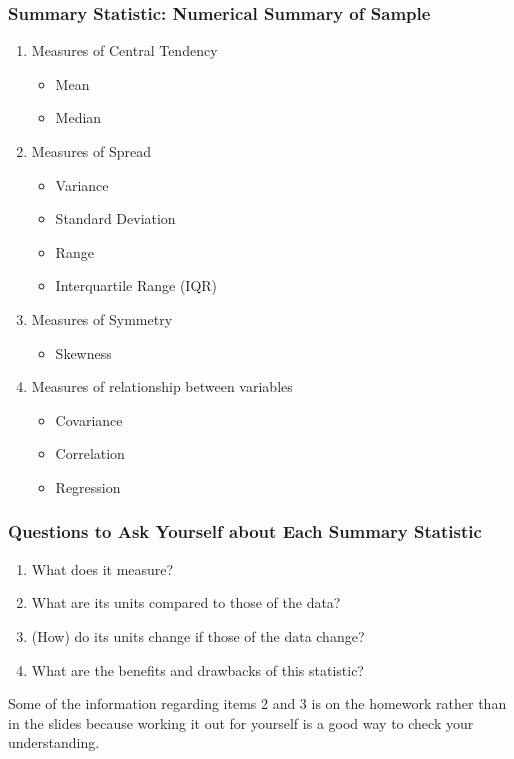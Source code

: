 \begin{frame}
\frametitle{Summary Statistic: Numerical Summary of Sample}
	\begin{enumerate}
\item Measures of Central Tendency
	\begin{itemize}
\item Mean
\item Median
\end{itemize}\pause
\item Measures of Spread
	\begin{itemize}
\item Variance
\item Standard Deviation
\item Range
\item Interquartile Range (IQR)
\end{itemize} \pause
\item Measures of Symmetry
	\begin{itemize}
		\item Skewness
	\end{itemize} \pause
\item Measures of relationship between variables 
	\begin{itemize}
\item Covariance
\item Correlation
\item Regression
\end{itemize}
\end{enumerate}
\end{frame}
\begin{frame}
\frametitle{Questions to Ask Yourself about Each Summary Statistic}
\begin{enumerate}
\item What does it measure?
\item What are its units compared to those of the data?
\item (How) do its units change if those of the data change?
\item What are the benefits and drawbacks of this statistic?
\end{enumerate}

\vspace{2em}
\alert{Some of the information regarding items 2 and 3 is on the homework rather than in the slides because working it out for yourself is a good way to check your understanding.}
\end{frame}


